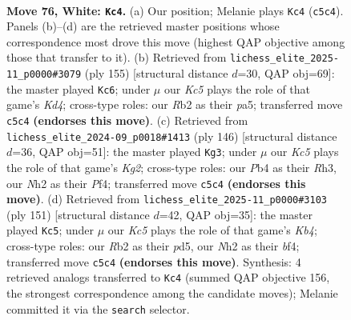 \documentclass[11pt]{article}
\begin{document}
\clearpage

\begin{figure}[p]\centering
\begin{subfigure}{0.46\textwidth}\centering
\resizebox{\linewidth}{!}{%
\newchessgame
\chessboard[
  setfen={1Bb5/4k3/8/2K3r1/PP6/5B1p/1R5N/8 w - - 9 76},
  showmover=false,
  pgfstyle=straightmove, color=movearrow, markmove={c5-c4}
]}
\caption{}
\end{subfigure}\hfill
\begin{subfigure}{0.46\textwidth}\centering
\resizebox{\linewidth}{!}{%
\newchessgame
\chessboard[
  setfen={8/8/p2n4/Pbpk3R/5K2/8/8/4B3 b - - 34 78},
  showmover=false,
  pgfstyle=straightmove, color=movearrow, markmove={d5-c6}
]}
\caption{}
\end{subfigure}
\\[4pt]
\begin{subfigure}{0.46\textwidth}\centering
\resizebox{\linewidth}{!}{%
\newchessgame
\chessboard[
  setfen={8/8/8/2k1Bp1p/5P1P/7R/3r2K1/8 w - - 3 74},
  showmover=false,
  pgfstyle=straightmove, color=movearrow, markmove={g2-g3}
]}
\caption{}
\end{subfigure}\hfill
\begin{subfigure}{0.46\textwidth}\centering
\resizebox{\linewidth}{!}{%
\newchessgame
\chessboard[
  setfen={8/1R6/8/1k1P4/1p1bPB2/pP4K1/r7/8 b - - 1 76},
  showmover=false,
  pgfstyle=straightmove, color=movearrow, markmove={b5-c5}
]}
\caption{}
\end{subfigure}
\caption{\textbf{Move 76, White: \texttt{Kc4}.} (a) Our position; Melanie plays \texttt{Kc4} (\texttt{c5c4}). Panels (b)--(d) are the retrieved master positions whose correspondence most drove this move (highest QAP objective among those that transfer to it). (b) Retrieved from \texttt{lichess\_elite\_2025-11\_p0000\#3079} (ply 155) [structural distance $d$=30, QAP obj=69]: the master played \texttt{Kc6}; under $\mu$ our \emph{Kc5} plays the role of that game's \emph{Kd4}; cross-type roles: our \emph{R}b2 as their \emph{p}a5; transferred move \texttt{c5c4} \textbf{(endorses this move)}. (c) Retrieved from \texttt{lichess\_elite\_2024-09\_p0018\#1413} (ply 146) [structural distance $d$=36, QAP obj=51]: the master played \texttt{Kg3}; under $\mu$ our \emph{Kc5} plays the role of that game's \emph{Kg2}; cross-type roles: our \emph{P}b4 as their \emph{R}h3, our \emph{N}h2 as their \emph{P}f4; transferred move \texttt{c5c4} \textbf{(endorses this move)}. (d) Retrieved from \texttt{lichess\_elite\_2025-11\_p0000\#3103} (ply 151) [structural distance $d$=42, QAP obj=35]: the master played \texttt{Kc5}; under $\mu$ our \emph{Kc5} plays the role of that game's \emph{Kb4}; cross-type roles: our \emph{R}b2 as their \emph{p}d5, our \emph{N}h2 as their \emph{b}f4; transferred move \texttt{c5c4} \textbf{(endorses this move)}. Synthesis: 4 retrieved analogs transferred to \texttt{Kc4} (summed QAP objective 156, the strongest correspondence among the candidate moves); Melanie committed it via the \texttt{search} selector.}
\label{fig:thought-m150}
\end{figure}
\end{document}
